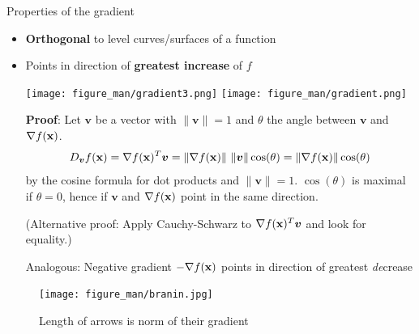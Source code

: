 \documentclass[11pt,compress,t,notes=noshow, xcolor=table]{beamer}
\begin{document}
\begin{vbframe}{Properties of the gradient}

\begin{itemize}
	\item \textbf{Orthogonal} to level curves/surfaces of a function
	\item Points in direction of \textbf{greatest increase} of $f$
	\begin{center}
		\texttt{[image: figure\_man/gradient3.png]} \texttt{[image: figure\_man/gradient.png]}
	\end{center}
	\begin{footnotesize}
    	\textbf{Proof}: Let $\bm{v}$ be a vector with $\|\bm{v}\|=1$ and $\theta$ the angle between $\bm{v}$ and $\nabla f(\mathbf{x})$. 
        \begin{equation*}
            D_{\bm{v}}f(\mathbf{x}) = \nabla f(\mathbf{x})^T \bm{v} = \|\nabla f(\mathbf{x})\|~\|\bm{v}\|\cos(\theta) = \|\nabla f(\mathbf{x})\| \cos(\theta)
        \end{equation*}
    	by the cosine formula for dot products and $\|\bm{v}\| = 1$.
        $\cos(\theta)$ is maximal if $\theta = 0$, hence if $\bm{v}$ and $\nabla f(\mathbf{x})$ point in the same direction.
        
    	(Alternative proof: Apply Cauchy-Schwarz to $\nabla f(\mathbf{x})^T \bm{v}$ and look for equality.)

        Analogous: Negative gradient $- \nabla f(\mathbf{x})$ points in direction of greatest \textit{de}crease
	\end{footnotesize}
\end{itemize}

\framebreak

\begin{figure}
    \centering
    \texttt{[image: figure\_man/branin.jpg]}
    \caption*{Length of arrows is norm of their gradient}
\end{figure}

\end{vbframe}
\end{document}
